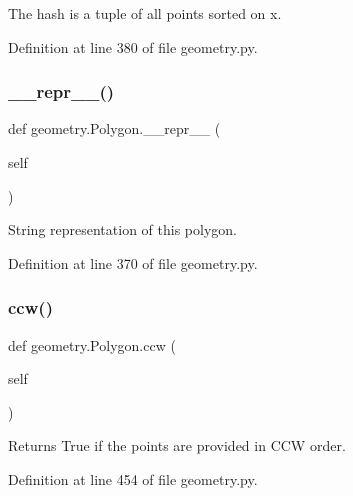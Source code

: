 \begin{DoxyVerb}The hash is a tuple of all points sorted on x.\end{DoxyVerb}
 

Definition at line 380 of file geometry.\+py.

\mbox{\label{classgeometry_1_1Polygon_a9c05f0f70dbb5652e29265671b036c71}} 
\subsubsection{\texorpdfstring{\+\_\+\+\_\+repr\+\_\+\+\_\+()}{\_\_repr\_\_()}}
{\footnotesize\ttfamily def geometry.\+Polygon.\+\_\+\+\_\+repr\+\_\+\+\_\+ (\begin{DoxyParamCaption}\item[{}]{self }\end{DoxyParamCaption})}

\begin{DoxyVerb}String representation of this polygon.\end{DoxyVerb}
 

Definition at line 370 of file geometry.\+py.

\mbox{\label{classgeometry_1_1Polygon_a4c6914db65978bbd2232f28bbb41b69b}} 
\subsubsection{\texorpdfstring{ccw()}{ccw()}}
{\footnotesize\ttfamily def geometry.\+Polygon.\+ccw (\begin{DoxyParamCaption}\item[{}]{self }\end{DoxyParamCaption})}

\begin{DoxyVerb}Returns True if the points are provided in CCW order.\end{DoxyVerb}
 

Definition at line 454 of file geometry.\+py.

\mbox{\label{classgeometry_1_1Polygon_aa39e7d0353ffad956679321aca725d35}} 
